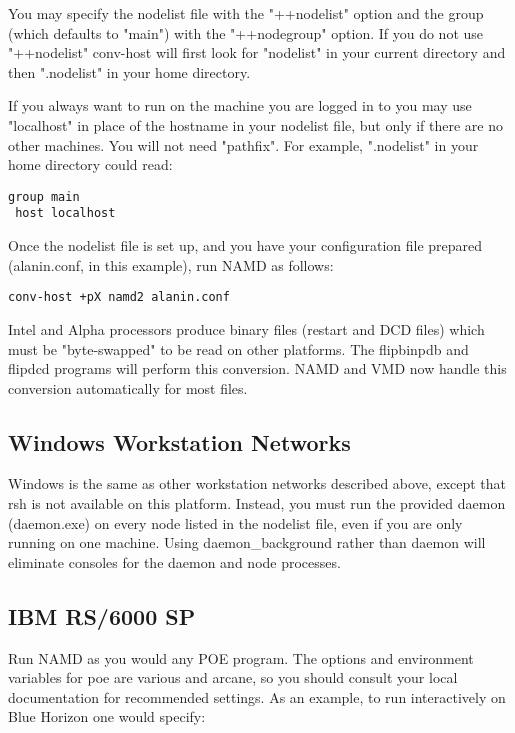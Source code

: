 You may specify the nodelist file with the "++nodelist" option and the
group (which defaults to "main") with the "++nodegroup" option.  If
you do not use "++nodelist" conv-host will first look for "nodelist"
in your current directory and then ".nodelist" in your home directory.

If you always want to run on the machine you are logged in to you may
use "localhost" in place of the hostname in your nodelist file, but
only if there are no other machines.  You will not need "pathfix".
For example, ".nodelist" in your home directory could read:

\begin{verbatim}
group main
 host localhost
\end{verbatim}

Once the nodelist file is set up, and you have your configuration file
prepared (alanin.conf, in this example), run NAMD as follows:

\begin{verbatim}
conv-host +pX namd2 alanin.conf
\end{verbatim}

Intel and Alpha processors produce binary files (restart and DCD
files) which must be "byte-swapped" to be read on other platforms.
The flipbinpdb and flipdcd programs will perform this conversion.
NAMD and VMD now handle this conversion automatically for most files.

\subsection{Windows Workstation Networks}

Windows is the same as other workstation networks described above,
except that rsh is not available on this platform.  Instead, you must
run the provided daemon (daemon.exe) on every node listed in the
nodelist file, even if you are only running on one machine.  Using
daemon\_background rather than daemon will eliminate consoles for the
daemon and node processes.

\subsection{IBM RS/6000 SP}

Run NAMD as you would any POE program.  The options and environment
variables for poe are various and arcane, so you should consult your
local documentation for recommended settings.  As an example, to run
interactively on Blue Horizon one would specify:

